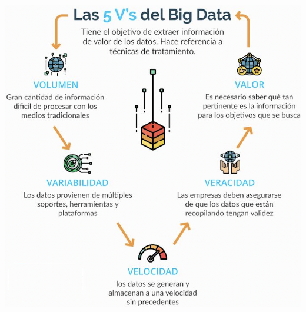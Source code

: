 \documentclass[
10pt, %
aspectratio=169, %
]{beamer}
\begin{document}
	\begin{frame}
		
		\centering
		\includegraphics[height=\paperheight]{5-v-big-data.png}
		
		
		
		
		
		
	\end{frame}
	
\end{document}
